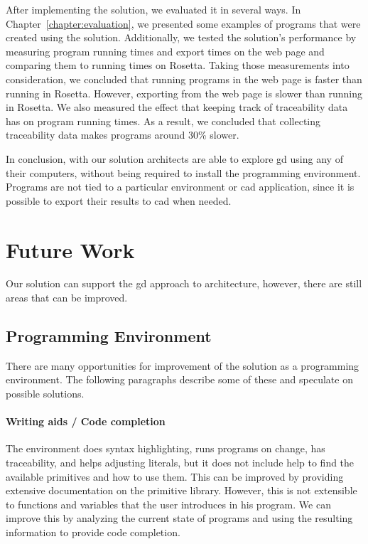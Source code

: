 After implementing the solution, we evaluated it in several ways.
In Chapter~\ref{chapter:evaluation}, we presented some examples of programs that were created using the solution.
Additionally, we tested the solution's performance by measuring program running times and export times on the web page and comparing them to running times on Rosetta.
Taking those measurements into consideration, we concluded that running programs in the web page is faster than running in Rosetta.
However, exporting from the web page is slower than running in Rosetta.
We also measured the effect that keeping track of traceability data has on program running times.
As a result, we concluded that collecting traceability data makes programs around 30\% slower.

In conclusion, with our solution architects are able to explore \gls{gd} using any of their computers, without being required to install the programming environment.
Programs are not tied to a particular environment or \gls{cad} application, since it is possible to export their results to \gls{cad} when needed.


\section{Future Work}
Our solution can support the \gls{gd} approach to architecture, however, there are still areas that can be improved.


\subsection{Programming Environment}
There are many opportunities for improvement of the solution as a programming environment.
The following paragraphs describe some of these and speculate on possible solutions.

\paragraph{Writing aids / Code completion}
The environment does syntax highlighting, runs programs on change, has traceability, and helps adjusting literals, but it does not include help to find the available primitives and how to use them.
This can be improved by providing extensive documentation on the primitive library.
However, this is not extensible to functions and variables that the user introduces in his program.
We can improve this by analyzing the current state of programs and using the resulting information to provide code completion.

